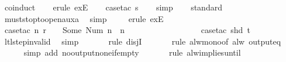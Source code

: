\begin{isabellebody}
\ coinduct\isanewline
\isanewline
\ \ \isamarkupfalse%
\ {\isacharparenleft}erule\ exE{\isacharparenright}\isanewline
\ \ \isamarkupfalse%
\ {\isacharparenleft}case{\isacharunderscore}tac\ {\isachardoublequoteopen}s{\isacharequal}{}{\isachardoublequoteclose}{\isacharparenright}\isanewline
\isanewline
\ \ \isamarkupfalse%
\ simp\isanewline
\ \ \isamarkupfalse%
\ standard\isanewline
\ \ \isamarkupfalse%
\ must{\isacharunderscore}stop{\isacharunderscore}to{\isacharunderscore}open{\isacharunderscore}aux{}a\ \isamarkupfalse%
\ simp\isanewline
\ \ \ \isamarkupfalse%
\ {\isacharparenleft}erule\ exE{\isacharparenright}{\isacharplus}\isanewline
\ \ \ \ \isamarkupfalse%
\ {\isacharparenleft}case{\isacharunderscore}tac\ {\isachardoublequoteopen}{\isasymexists}n{\isachardot}\ r\ {\isachardollar}\ {}\ {\isacharequal}\ Some\ {\isacharparenleft}Num\ n{\isacharparenright}\ {\isasymand}\ n\ {\isasymin}\ {\isacharbraceleft}{}{\isacharcomma}\ {}{\isacharcomma}\ {}{\isacharcomma}\ {}{\isacharbraceright}{\isachardoublequoteclose}{\isacharparenright}\isanewline
\ \ \ \ \isamarkupfalse%
\ {}\isanewline
\ \ \ \ \ \isamarkupfalse%
\ {\isacharparenleft}case{\isacharunderscore}tac\ {\isachardoublequoteopen}shd\ t{\isachardoublequoteclose}{\isacharparenright}\isanewline
\ \ \isamarkupfalse%
\ ltl{\isacharunderscore}step{\isacharunderscore}{}{\isacharunderscore}invalid\ \isamarkupfalse%
\ simp\isanewline
\ \ \ \ \ \isamarkupfalse%
\ {\isacharparenleft}rule\ disjI{}{\isacharparenright}\isanewline
\ \ \ \ \ \isamarkupfalse%
\ {\isacharparenleft}rule\ alw{\isacharunderscore}mono{\isacharbrackleft}of\ {\isachardoublequoteopen}alw\ {\isacharparenleft}output{\isacharunderscore}eq\ {\isacharbrackleft}{\isacharbrackright}{\isacharparenright}{\isachardoublequoteclose}{\isacharbrackright}{\isacharparenright}\isanewline
\ \ \ \ \isamarkupfalse%
\ {\isacharparenleft}simp\ add{\isacharcolon}\ no{\isacharunderscore}output{\isacharunderscore}none{\isacharunderscore}if{\isacharunderscore}empty{\isacharparenright}\isanewline
\ \ \ \ \ \isamarkupfalse%
\ {\isacharparenleft}rule\ alw{\isacharunderscore}implies{\isacharunderscore}until{\isacharparenright}\isanewline
\ \ \ \ \ \isamarkupfalse%

\end{isabellebody}
